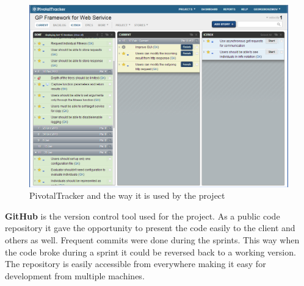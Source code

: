 \begin{figure}[htp]
\centering
\includegraphics[scale=0.5]{Figures/pivotalTracker.png}
\caption{PivotalTracker and the way it is used by the project}
\label{fig:pivotalTracker}
\end{figure}

\textbf{GitHub} is the version control tool used for the project. As a public code repository it gave the opportunity to present the code easily to the client and
others as well. Frequent commits were done during the sprints. This way when the code broke during a sprint it could be reversed back to a working version. The repository
is easily accessible from everywhere making it easy for development from  multiple machines.

